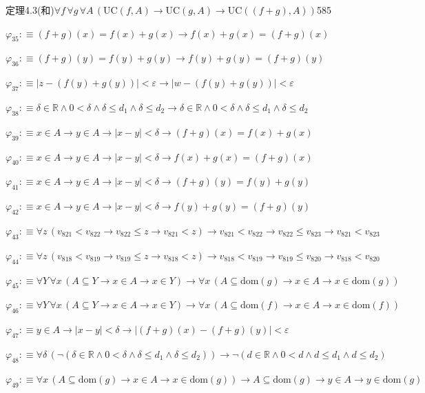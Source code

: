 \begin{fullproof}{定理4.3(和)}{$\forall f\,\forall g\,\forall A\,(\mathrm{UC}(f,A) \to \mathrm{UC}(g,A) \to \mathrm{UC}((f + g),A))$}{585}
\begin{abbrevlist}
\item $\varphi_{35} :\equiv (f + g)(x) = f(x) + g(x) \to f(x) + g(x) = (f + g)(x)$
\item $\varphi_{36} :\equiv (f + g)(y) = f(y) + g(y) \to f(y) + g(y) = (f + g)(y)$
\item $\varphi_{37} :\equiv \lvert z - (f(y) + g(y)) \rvert < \varepsilon \to \lvert w - (f(y) + g(y)) \rvert < \varepsilon$
\item $\varphi_{38} :\equiv \delta \in \mathbb{R} \land 0 < \delta \land \delta \leq d_{1} \land \delta \leq d_{2} \to \delta \in \mathbb{R} \land 0 < \delta \land \delta \leq d_{1} \land \delta \leq d_{2}$
\item $\varphi_{39} :\equiv x \in A \to y \in A \to \lvert x - y \rvert < \delta \to (f + g)(x) = f(x) + g(x)$
\item $\varphi_{40} :\equiv x \in A \to y \in A \to \lvert x - y \rvert < \delta \to f(x) + g(x) = (f + g)(x)$
\item $\varphi_{41} :\equiv x \in A \to y \in A \to \lvert x - y \rvert < \delta \to (f + g)(y) = f(y) + g(y)$
\item $\varphi_{42} :\equiv x \in A \to y \in A \to \lvert x - y \rvert < \delta \to f(y) + g(y) = (f + g)(y)$
\item $\varphi_{43} :\equiv \forall z\,(v_{821} < v_{822} \to v_{822} \leq z \to v_{821} < z) \to v_{821} < v_{822} \to v_{822} \leq v_{823} \to v_{821} < v_{823}$
\item $\varphi_{44} :\equiv \forall z\,(v_{818} < v_{819} \to v_{819} \leq z \to v_{818} < z) \to v_{818} < v_{819} \to v_{819} \leq v_{820} \to v_{818} < v_{820}$
\item $\varphi_{45} :\equiv \forall Y\,\forall x\,(A \subseteq Y \to x \in A \to x \in Y) \to \forall x\,(A \subseteq \mathrm{dom}(g) \to x \in A \to x \in \mathrm{dom}(g))$
\item $\varphi_{46} :\equiv \forall Y\,\forall x\,(A \subseteq Y \to x \in A \to x \in Y) \to \forall x\,(A \subseteq \mathrm{dom}(f) \to x \in A \to x \in \mathrm{dom}(f))$
\item $\varphi_{47} :\equiv y \in A \to \lvert x - y \rvert < \delta \to \lvert (f + g)(x) - (f + g)(y) \rvert < \varepsilon$
\item $\varphi_{48} :\equiv \forall \delta\,(\neg (\delta \in \mathbb{R} \land 0 < \delta \land \delta \leq d_{1} \land \delta \leq d_{2})) \to \neg (d \in \mathbb{R} \land 0 < d \land d \leq d_{1} \land d \leq d_{2})$
\item $\varphi_{49} :\equiv \forall x\,(A \subseteq \mathrm{dom}(g) \to x \in A \to x \in \mathrm{dom}(g)) \to A \subseteq \mathrm{dom}(g) \to y \in A \to y \in \mathrm{dom}(g)$

\end{abbrevlist}
\end{fullproof}
